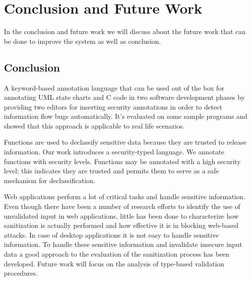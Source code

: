 \chapter{Conclusion and Future Work}

In the conclusion and future work we will discuss about the future work that can
be done to improve the system as well as conclusion.

\section{Conclusion}
A keyword-based annotation language that can be used out of the box for annotating UML state charts and C code in two software development phases by providing two editors for inserting security annotations in order to detect information flow bugs automatically. It's evaluated on some sample programs and showed that this approach is applicable to real life scenarios.

Functions are used to declassify sensitive data because they are trusted to release information. Our work introduces a security-typed language. We annotate functions with security levels. Functions may be annotated with a high security level; this indicates they are trusted and permits them to serve as a safe mechanism for declassification.

Web applications perform a lot of critical tasks and
handle sensitive information. Even though there have been
a number of research efforts to identify the use of unvalidated input in web applications, little has been done
to characterize how sanitization is actually performed and
how effective it is in blocking web-based attacks. In case of desktop applications it is not easy to handle sensitive information. To handle these sensitive information and invalidate insecure input data a good approach to the evaluation of the sanitization process has been developed. Future work will focus on the analysis of type-based validation procedures.

